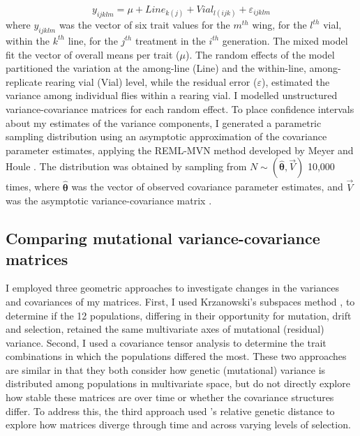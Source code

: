 \vspace{-\parskip}
\begin{equation}
y_{ijklm} = \mu + Line_{k(j)} + Vial_{l(ijk)}+ \varepsilon_{ijklm} \label{eqn:multi_1}
\end{equation}
\noindent where $y_{ijklm}$ was the vector of six trait values for the $m^{th}$ wing, for the $l^{th}$ vial, within the $k^{th}$ line, for the $j^{th}$ treatment in the $i^{th}$ generation. The mixed model fit the vector of overall means per trait ($\mu$). The random effects of the model partitioned the variation at the among-line (Line) and the within-line, among-replicate rearing vial (Vial) level, while the residual error ($\varepsilon$), estimated the variance among individual flies within a rearing vial. I modelled unstructured variance-covariance matrices for each random effect. To place confidence intervals about my estimates of the variance components, I generated a parametric sampling distribution using an asymptotic approximation of the covariance parameter estimates, applying the REML-MVN method developed by Meyer and Houle \citeyear{Houl15,Meye13}. The distribution was obtained by sampling from $N\sim(\boldsymbol{\hat{\theta}}, \vec{V})$ 10,000 times, where $\boldsymbol{\hat{\theta}}$ was the vector of observed covariance parameter estimates, and $\vec{V}$ was the asymptotic variance-covariance matrix \citep{Houl15,Meye13,Szte17a}. \par

\subsection{Comparing mutational variance-covariance matrices}

I employed three geometric approaches to investigate changes in the variances and covariances of my matrices. First, I used Krzanowski's subspaces method \citep{Krza79, Agui14}, to determine if the 12 populations, differing in their opportunity for mutation, drift and selection, retained the same multivariate axes of mutational (residual) variance. Second, I used a covariance tensor analysis to determine the trait combinations in which the populations differed the most. These two approaches are similar in that they both consider how genetic (mutational) variance is distributed among populations in multivariate space, but do not directly explore how stable these matrices are over time or whether the covariance structures differ. To address this, the third approach used \citet{Mitt09}’s relative genetic distance to explore how matrices diverge through time and across varying levels of selection.\par

